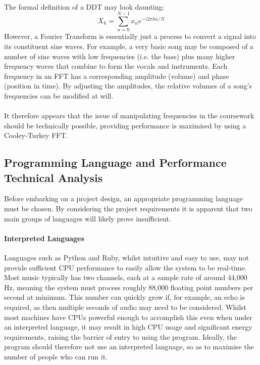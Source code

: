 \documentclass{article}
\begin{document}
	\paragraph{}
	The formal definition of a DDT may look daunting:
	\[
	X_k = \sum_{n=0}^{N-1} x_n e^{-i2\pi k n/N} 
	\]
	However, a Fourier Transform is essentially just a process to convert a signal into its constituent sine waves. For example, a very basic song may be composed of a number of sine waves with low frequencies (i.e. the bass) plus many higher frequency waves that combine to form the vocals and instruments. Each frequency in an FFT has a corresponding amplitude (volume) and phase (position in time). By adjusting the amplitudes, the relative volumes of a song's frequencies can be modified at will.
	
	\paragraph{}
	It therefore appears that the issue of manipulating frequencies in the coursework should be technically possible, providing performance is maximised by using a Cooley-Turkey FFT.

	\subsection{Programming Language  and Performance Technical Analysis}
	Before embarking on a project design, an appropriate programming language must be chosen. By considering the project requirements it is apparent that two main groups of languages will likely prove insufficient.
	
	\paragraph{Interpreted Languages}
	Languages such as Python and Ruby, whilst intuitive and easy to use, may not provide sufficient CPU performance to easily allow the system to be real-time. Most music typically has two channels, each at a sample rate of around 44,000 Hz, meaning the system must process roughly 88,000 floating point numbers per second at minimum. This number can quickly grow if, for example, an echo is required, as then multiple seconds of audio may need to be considered. Whilst most machines have CPUs powerful enough to accomplish this even when under an interpreted language, it may result in high CPU usage and significant energy requirements, raising the barrier of entry to using the program. Ideally, the program should therefore not use an interpreted language, so as to maximise the number of people who can run it.
	
\end{document}
